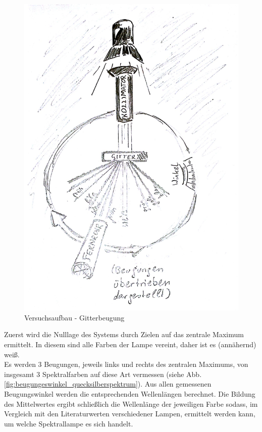 \documentclass[12pt,a4paper]{article}
\begin{document}
\begin{multicols}{2}
\begin{figure}[H]
	\includegraphics[scale=0.40]{./figure/gitter_beugung_zeichnung.png}
	\caption{Versuchsaufbau - Gitterbeugung}
	\label{fig:aufbau_gitter}
\end{figure}

Zuerst wird die Nulllage des Systems durch Zielen auf das zentrale Maximum ermittelt. In diesem sind alle Farben der Lampe vereint, daher ist es (annähernd) weiß.\\
Es werden 3 Beugungen, jeweils links und rechts des zentralen Maximums, von insgesamt 3 Spektralfarben auf diese Art vermessen (siehe Abb. \ref{fig:beugungeswinkel_quecksilberspektrum}). Aus allen gemessenen Beugungswinkel werden die entsprechenden Wellenlängen berechnet. Die Bildung des Mittelwertes ergibt schließlich die Wellenlänge der jeweiligen Farbe sodass, im Vergleich mit den Literaturwerten verschiedener Lampen, ermittelt werden kann, um welche Spektrallampe es sich handelt.


\end{multicols}
\end{document}

